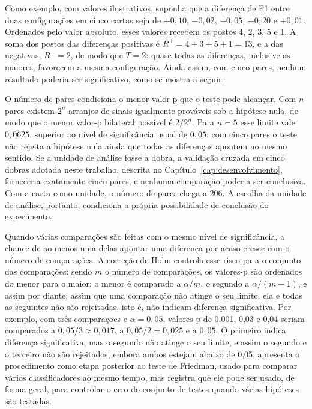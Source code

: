 \documentclass[
    12pt,                %
    openright,           %
    oneside,             %
    a4paper,             %
    english,             %
    brazil               %
]{abntex2}
\begin{document}
Como exemplo, com valores ilustrativos, suponha que a diferença de F1
entre duas configurações em cinco cartas seja de $+0{,}10$, $-0{,}02$,
$+0{,}05$, $+0{,}20$ e $+0{,}01$. Ordenados pelo valor absoluto, esses
valores recebem os postos 4, 2, 3, 5 e 1. A soma dos postos das
diferenças positivas é $R^+ = 4 + 3 + 5 + 1 = 13$, e a das negativas,
$R^- = 2$, de modo que $T = 2$: quase todas as diferenças, inclusive as
maiores, favorecem a mesma configuração. Ainda assim, com cinco pares,
nenhum resultado poderia ser significativo, como se mostra a seguir.

O número de pares condiciona o menor valor-p que o teste pode alcançar. Com
$n$ pares existem $2^n$ arranjos de sinais igualmente prováveis sob a hipótese
nula, de modo que o menor valor-p bilateral possível é $2/2^n$. Para $n = 5$
esse limite vale $0{,}0625$, superior ao nível de significância usual de
$0{,}05$: com cinco pares o teste não rejeita a hipótese nula ainda que todas
as diferenças apontem no mesmo sentido. Se a unidade de análise fosse a
dobra, a validação cruzada em cinco dobras adotada neste trabalho,
descrita no Capítulo~\ref{cap:desenvolvimento}, forneceria exatamente
cinco pares, e nenhuma comparação poderia ser conclusiva. Com a carta
como unidade, o número de pares chega a 206. A escolha da unidade de análise,
portanto, condiciona a própria possibilidade de conclusão do experimento.

Quando várias comparações são feitas com o mesmo nível de significância, a
chance de ao menos uma delas apontar uma diferença por acaso cresce com o
número de comparações. A correção de Holm controla esse risco para o conjunto
das comparações: sendo $m$ o número de comparações, os valores-p são
ordenados do menor para o maior; o menor é comparado a $\alpha/m$, o segundo
a $\alpha/(m-1)$, e assim por diante; assim que uma comparação não atinge o
seu limite, ela e todas as seguintes não são rejeitadas, isto é, não indicam
diferença significativa. Por exemplo, com três comparações e
$\alpha = 0{,}05$, valores-p de 0,001, 0,03 e 0,04 seriam comparados a
$0{,}05/3 \approx 0{,}017$, a $0{,}05/2 = 0{,}025$ e a $0{,}05$. O
primeiro indica diferença significativa, mas o segundo não atinge o seu
limite, e assim o segundo e o terceiro não são rejeitados, embora ambos
estejam abaixo de 0,05.
 apresenta o procedimento como etapa posterior ao
teste de Friedman, usado para comparar vários classificadores ao mesmo tempo,
mas registra que ele pode ser usado, de forma geral, para controlar o erro do
conjunto de testes quando várias hipóteses são testadas.
\end{document}
